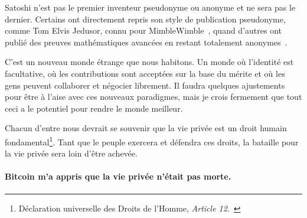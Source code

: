 Satoshi n'est pas le premier inventeur pseudonyme ou anonyme et ne sera pas le
dernier. Certains ont directement repris son style de publication pseudonyme,
comme Tom Elvis Jedusor, connu pour MimbleWimble~\cite{mimblewimble-origin},
quand d'autres ont publié des preuves mathématiques avancées en restant
totalement anonymes~\cite{4chan-math}.

C'est un nouveau monde étrange que nous habitons. Un monde où l'identité est
facultative, où les contributions sont acceptées sur la base du mérite et où les
gens peuvent collaborer et négocier librement. Il faudra quelques ajustements
pour être à l'aise avec ces nouveaux paradigmes, mais je crois fermement que
tout ceci a le potentiel pour rendre le monde meilleur.

Chacun d'entre nous devrait se souvenir que la vie privée est un droit humain
fondamental\footnote{Déclaration universelle des Droits de l'Homme,
\textit{Article 12}.~\cite{article12}}. Tant que le peuple exercera et défendra
ces droits, la bataille pour la vie privée sera loin d'être achevée.

\paragraph{Bitcoin m'a appris que la vie privée n'était pas morte.}

%
%
%
%
